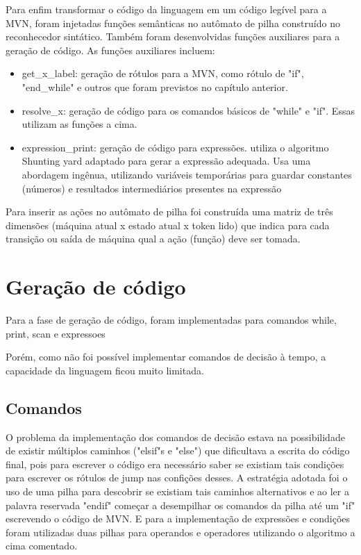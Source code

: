 \label{Cap:Ações semânticas}

Para enfim transformar o código da linguagem em um código legível para a MVN, foram injetadas funções semânticas no autômato de pilha construído no reconhecedor sintático. Também foram desenvolvidas funções auxiliares para a geração de código. As funções auxiliares incluem:

\begin{itemize}
\item{get\_x\_label: geração de rótulos para a MVN, como rótulo de "if", "end\_while" e outros que foram previstos no capítulo anterior.}
\item{resolve\_x: geração de código para os comandos básicos de "while" e "if". Essas utilizam as funções a cima.}
\item{expression\_print: geração de código para expressões. utiliza o algoritmo Shunting yard adaptado para gerar a expressão adequada. Usa uma abordagem ingênua, utilizando variáveis temporárias para guardar constantes (números) e resultados intermediários presentes na expressão}
\end{itemize}

Para inserir as ações no autômato de pilha foi construída uma matriz de três dimensões (máquina atual x estado atual x token lido) que indica para cada transição ou saída de máquina qual a ação (função) deve ser tomada. 

\section{Geração de código}

Para a fase de geração de código, foram implementadas para comandos while, print, scan e expressoes

Porém, como não foi possível implementar comandos de decisão à tempo, a capacidade da linguagem ficou muito limitada. 

\subsection{Comandos}

O problema da implementação dos comandos de decisão estava na possibilidade de existir múltiplos caminhos ("elsif"s e "else") que dificultava a escrita do código final, pois para escrever o código era necessário saber se existiam tais condições para escrever os rótulos de jump nas confições desses. A estratégia adotada foi o uso de uma pilha para descobrir se existiam tais caminhos alternativos e ao ler a palavra reservada "endif" começar a desempilhar os comandos da pilha até um "if" escrevendo o código de MVN.
E para a implementação de expressões e condições foram utilizadas duas pilhas para operandos e operadores utilizando o algoritmo a cima comentado.

